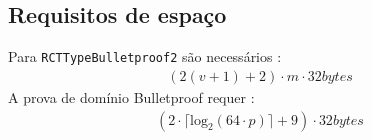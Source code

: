 

\newpage
\subsection{Requisitos de espaço}

Para {\tt RCTTypeBulletproof2} são necessários :
\begin{align*}
(2(v+1)+2) \cdot m \cdot 32 bytes
\end{align*}
A prova de domínio Bulletproof requer :
\begin{align*}
(2 \cdot \lceil \textrm{log}_2(64 \cdot p) \rceil + 9) \cdot 32 bytes
\end{align*}


